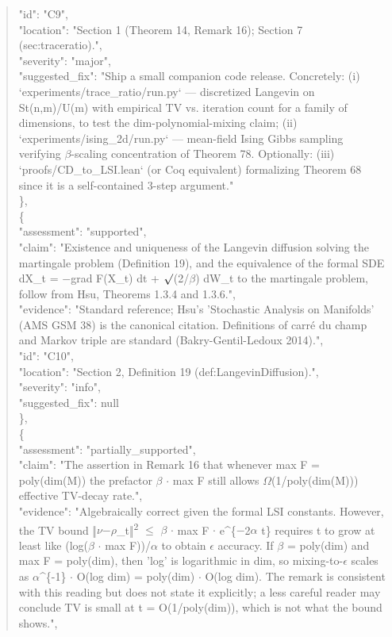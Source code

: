 \documentclass[11pt]{article}
\begin{document}
\begin{quote}
      "id": "C9",\\
      "location": "Section 1 (Theorem 14, Remark 16); Section 7 (sec:traceratio).",\\
      "severity": "major",\\
      "suggested\_fix": "Ship a small companion code release. Concretely: (i) `experiments/trace\_ratio/run.py` --- discretized Langevin on St(n,m)/U(m) with empirical TV vs. iteration count for a family of dimensions, to test the dim-polynomial-mixing claim; (ii) `experiments/ising\_2d/run.py` --- mean-field Ising Gibbs sampling verifying \ensuremath{\beta}-scaling concentration of Theorem 78. Optionally: (iii) `proofs/CD\_to\_LSI.lean` (or Coq equivalent) formalizing Theorem 68 since it is a self-contained 3-step argument."\\
    \},\\
    \{\\
      "assessment": "supported",\\
      "claim": "Existence and uniqueness of the Langevin diffusion solving the martingale problem (Definition 19), and the equivalence of the formal SDE dX\_t = \ensuremath{-}grad F(X\_t) dt + \ensuremath{\surd}(2/\ensuremath{\beta}) dW\_t to the martingale problem, follow from Hsu, Theorems 1.3.4 and 1.3.6.",\\
      "evidence": "Standard reference; Hsu's 'Stochastic Analysis on Manifolds' (AMS GSM 38) is the canonical citation. Definitions of carré du champ and Markov triple are standard (Bakry-Gentil-Ledoux 2014).",\\
      "id": "C10",\\
      "location": "Section 2, Definition 19 (def:LangevinDiffusion).",\\
      "severity": "info",\\
      "suggested\_fix": null\\
    \},\\
    \{\\
      "assessment": "partially\_supported",\\
      "claim": "The assertion in Remark 16 that whenever max F = poly(dim(M)) the prefactor \ensuremath{\beta} \ensuremath{\cdot} max F still allows \ensuremath{\Omega}(1/poly(dim(M))) effective TV-decay rate.",\\
      "evidence": "Algebraically correct given the formal LSI constants. However, the TV bound ‖\ensuremath{\nu}\ensuremath{-}\ensuremath{\rho}\_t‖\textsuperscript{2} \ensuremath{\le} \ensuremath{\beta} \ensuremath{\cdot} max F \ensuremath{\cdot} e\^{}\{\ensuremath{-}2\ensuremath{\alpha} t\} requires t to grow at least like (log(\ensuremath{\beta} \ensuremath{\cdot} max F))/\ensuremath{\alpha} to obtain \ensuremath{\epsilon} accuracy. If \ensuremath{\beta} = poly(dim) and max F = poly(dim), then 'log' is logarithmic in dim, so mixing-to-\ensuremath{\epsilon} scales as \ensuremath{\alpha}\^{}\{-1\} \ensuremath{\cdot} O(log dim) = poly(dim) \ensuremath{\cdot} O(log dim). The remark is consistent with this reading but does not state it explicitly; a less careful reader may conclude TV is small at t = O(1/poly(dim)), which is not what the bound shows.",\\

\end{quote}
\end{document}
